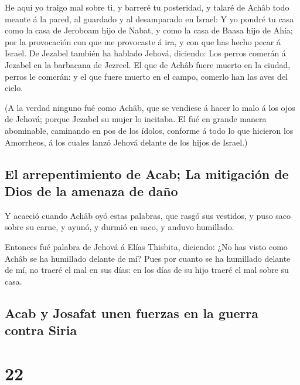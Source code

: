  He aquí yo traigo mal sobre ti, y barreré tu posteridad,
y talaré de Achâb todo meante á la pared, al guardado y al desamparado
en Israel:  Y yo pondré tu casa como la casa de Jeroboam
hijo de Nabat, y como la casa de Baasa hijo de Ahía; por la provocación
con que me provocaste á ira, y con que has hecho pecar á Israel.
 De Jezabel también ha hablado Jehová, diciendo: Los
perros comerán á Jezabel en la barbacana de Jezreel.  El
que de Achâb fuere muerto en la ciudad, perros le comerán: y el que
fuere muerto en el campo, comerlo han las aves del cielo.

 (A la verdad ninguno fué como Achâb, que se vendiese á
hacer lo malo á los ojos de Jehová; porque Jezabel su mujer lo incitaba.
 El fué en grande manera abominable, caminando en pos de
los ídolos, conforme á todo lo que hicieron los Amorrheos, á los cuales
lanzó Jehová delante de los hijos de Israel.)

\hypertarget{el-arrepentimiento-de-acab-la-mitigaciuxf3n-de-dios-de-la-amenaza-de-dauxf1o}{%
\subsection{El arrepentimiento de Acab; La mitigación de Dios de la
amenaza de
daño}\label{el-arrepentimiento-de-acab-la-mitigaciuxf3n-de-dios-de-la-amenaza-de-dauxf1o}}

 Y acaeció cuando Achâb oyó estas palabras, que rasgó sus
vestidos, y puso saco sobre su carne, y ayunó, y durmió en saco, y
anduvo humillado.

 Entonces fué palabra de Jehová á Elías Thisbita,
diciendo:  ¿No has visto como Achâb se ha humillado
delante de mí? Pues por cuanto se ha humillado delante de mí, no traeré
el mal en sus días: en los días de su hijo traeré el mal sobre su casa.

\hypertarget{acab-y-josafat-unen-fuerzas-en-la-guerra-contra-siria}{%
\subsection{Acab y Josafat unen fuerzas en la guerra contra
Siria}\label{acab-y-josafat-unen-fuerzas-en-la-guerra-contra-siria}}

\hypertarget{section-21}{%
\section{22}\label{section-21}}

